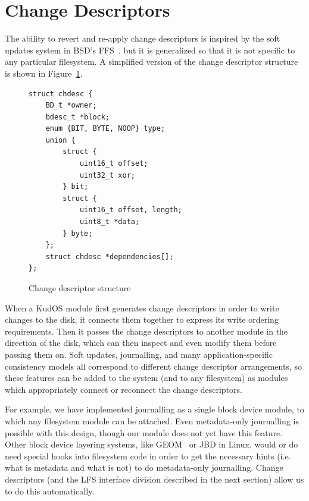 \preparagraphspacing{}
\section*{Change Descriptors}
\label{sec:chdescs}


The ability to revert and re-apply change descriptors is inspired by the soft
updates system in BSD's FFS~\cite{ganger00soft}, but it is generalized so that
it is not specific to any particular filesystem. A simplified version of the
change descriptor structure is shown in Figure~\ref{fig:chdesc}.

\begin{figure}
\begin{verbatim}
struct chdesc {
    BD_t *owner;
    bdesc_t *block;
    enum {BIT, BYTE, NOOP} type;
    union {
        struct {
            uint16_t offset;
            uint32_t xor;
        } bit;
        struct {
            uint16_t offset, length;
            uint8_t *data;
        } byte;
    };
    struct chdesc *dependencies[];
};
\end{verbatim}
\vspace{-12pt}
\caption{\label{fig:chdesc} Change descriptor structure}
\end{figure}

When a KudOS module first generates change descriptors in order to write changes
to the disk, it connects them together to express its write ordering
requirements. Then it passes the change descriptors to another module in the
direction of the disk, which can then inspect and even modify them before
passing them on. Soft updates, journalling, and many application-specific
consistency models all correspond to different change descriptor arrangements,
so these features can be added to the system (and to any filesystem) as modules
which appropriately connect or reconnect the change descriptors.

For example, we have implemented journalling as a single block device module, to
which any filesystem module can be attached. Even metadata-only journalling is
possible with this design, though our module does not yet have this feature.
Other block device layering systems, like GEOM~\cite{geom} or JBD in Linux,
would or do need special hooks into filesystem code in order to get the
necessary hints (i.e. what is metadata and what is not) to do metadata-only
journalling. Change descriptors (and the LFS interface division described in the
next section) allow us to do this automatically.

